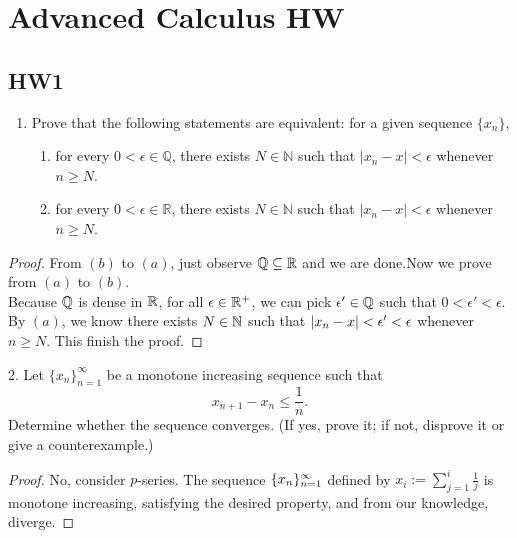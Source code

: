 \documentclass{report}
\begin{document}
\chapter{Advanced Calculus HW}
\section{HW1}
\begin{question}{}{}
\begin{enumerate}
    \item Prove that the following statements are equivalent: for a given sequence $\{x_n\}$,
    \begin{enumerate}
        \item for every $0 < \epsilon \in \mathbb{Q}$, there exists $N \in \mathbb{N}$ such that $|x_n - x| < \epsilon$ whenever $n \geq N$.
        \item for every $0 < \epsilon \in \mathbb{R}$, there exists $N \in \mathbb{N}$ such that $|x_n - x| < \epsilon$ whenever $n \geq N$.
    \end{enumerate}
\end{enumerate}
\end{question}
\begin{proof}
From $(b)$ to $(a)$, just observe  $\mathbb{Q} \subseteq \mathbb{R}$ and we are done.Now we prove from $(a)$ to $(b)$.\\

Because $\mathbb{Q}$ is dense in  $\mathbb{R}$,  for all $\epsilon \in \mathbb{R}^+$, we can pick $\epsilon' \in \mathbb{Q}$ such that $0<\epsilon '< \epsilon $. By $(a)$,  we know there exists $N\in \mathbb{N}$ such that $|x_n-x|<\epsilon ' <\epsilon $ whenever $n\geq N$. This finish the proof.
\end{proof}
\begin{question}{}{}
2. Let $\{x_n\}_{n=1}^{\infty}$ be a monotone increasing sequence such that 
\[x_{n+1} - x_n \leq \frac{1}{n}.\]
Determine whether the sequence converges. (If yes, prove it; if not, disprove it or give a counterexample.)
\end{question}
\begin{proof}
No, consider $p$-series. The sequence $\{ x_n \}_{n=1}^{\infty}$ defined by $x_i:=\sum_{j=1}^i \frac{1}{j}$ is monotone increasing, satisfying the desired property, and from our knowledge, diverge. 
\end{proof}
\end{document}
